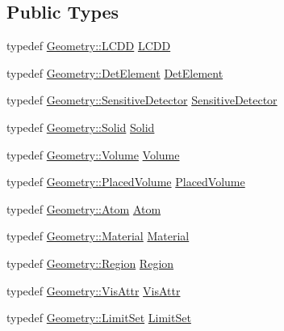 \subsection*{Public Types}
\begin{DoxyCompactItemize}
\item 
typedef \hyperlink{class_d_d4hep_1_1_geometry_1_1_l_c_d_d}{Geometry\+::\+L\+C\+DD} \hyperlink{class_d_d4hep_1_1_simulation_1_1_geant4_mapping_a7b098323f9ea570a13d220fe3f09da41}{L\+C\+DD}
\item 
typedef \hyperlink{class_d_d4hep_1_1_geometry_1_1_det_element}{Geometry\+::\+Det\+Element} \hyperlink{class_d_d4hep_1_1_simulation_1_1_geant4_mapping_a58a1cf6fc60a0928c1048fb1d32fcea5}{Det\+Element}
\item 
typedef \hyperlink{class_d_d4hep_1_1_geometry_1_1_sensitive_detector}{Geometry\+::\+Sensitive\+Detector} \hyperlink{class_d_d4hep_1_1_simulation_1_1_geant4_mapping_ae27ee51d13bf8ae59e8bee3fcecdbc85}{Sensitive\+Detector}
\item 
typedef \hyperlink{namespace_d_d4hep_1_1_geometry_a83de90a8dcc7378ba47d54ef9a6a687b}{Geometry\+::\+Solid} \hyperlink{class_d_d4hep_1_1_simulation_1_1_geant4_mapping_ac94b8af2661de6ba577901ae8cdea3f9}{Solid}
\item 
typedef \hyperlink{class_d_d4hep_1_1_geometry_1_1_volume}{Geometry\+::\+Volume} \hyperlink{class_d_d4hep_1_1_simulation_1_1_geant4_mapping_a86c52918ea76c0cbd7a4bffb971f33a5}{Volume}
\item 
typedef \hyperlink{class_d_d4hep_1_1_geometry_1_1_placed_volume}{Geometry\+::\+Placed\+Volume} \hyperlink{class_d_d4hep_1_1_simulation_1_1_geant4_mapping_a2cad95da5f969a6b67fb6d6944549ad6}{Placed\+Volume}
\item 
typedef \hyperlink{class_d_d4hep_1_1_geometry_1_1_atom}{Geometry\+::\+Atom} \hyperlink{class_d_d4hep_1_1_simulation_1_1_geant4_mapping_aa33a3f44904c6184ee883c244baa9554}{Atom}
\item 
typedef \hyperlink{class_d_d4hep_1_1_geometry_1_1_material}{Geometry\+::\+Material} \hyperlink{class_d_d4hep_1_1_simulation_1_1_geant4_mapping_a2539031128388f894af24898eb6189a7}{Material}
\item 
typedef \hyperlink{class_d_d4hep_1_1_geometry_1_1_region}{Geometry\+::\+Region} \hyperlink{class_d_d4hep_1_1_simulation_1_1_geant4_mapping_a48f9337eb1105d5874835c20456a652d}{Region}
\item 
typedef \hyperlink{class_d_d4hep_1_1_geometry_1_1_vis_attr}{Geometry\+::\+Vis\+Attr} \hyperlink{class_d_d4hep_1_1_simulation_1_1_geant4_mapping_aea00056d988cf94eb39b25514928e3a6}{Vis\+Attr}
\item 
typedef \hyperlink{class_d_d4hep_1_1_geometry_1_1_limit_set}{Geometry\+::\+Limit\+Set} \hyperlink{class_d_d4hep_1_1_simulation_1_1_geant4_mapping_a274f93e912e70a162849adb21f54184e}{Limit\+Set}
\end{DoxyCompactItemize}
